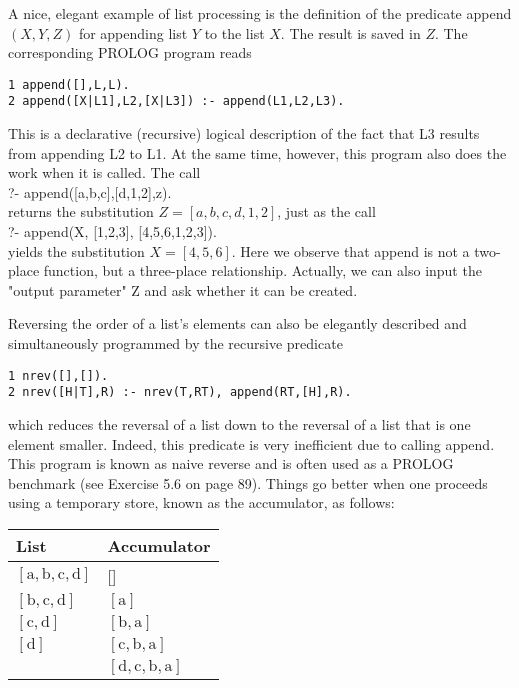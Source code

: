 \documentclass[10pt]{article}
\begin{document}
A nice, elegant example of list processing is the definition of the predicate append $(X, Y, Z)$ for appending list $Y$ to the list $X$. The result is saved in $Z$. The corresponding PROLOG program reads

\begin{verbatim}
1 append([],L,L).
2 append([X|L1],L2,[X|L3]) :- append(L1,L2,L3).
\end{verbatim}

This is a declarative (recursive) logical description of the fact that L3 results from appending L2 to L1. At the same time, however, this program also does the work when it is called. The call\\[0pt]
?- append([a,b,c],[d,1,2],z).\\
returns the substitution $Z=[a, b, c, d, 1,2]$, just as the call\\[0pt]
?- append(X, [1,2,3], [4,5,6,1,2,3]).\\
yields the substitution $X=[4,5,6]$. Here we observe that append is not a two-place function, but a three-place relationship. Actually, we can also input the "output parameter" Z and ask whether it can be created.

Reversing the order of a list's elements can also be elegantly described and simultaneously programmed by the recursive predicate

\begin{verbatim}
1 nrev([],[]).
2 nrev([H|T],R) :- nrev(T,RT), append(RT,[H],R).
\end{verbatim}

which reduces the reversal of a list down to the reversal of a list that is one element smaller. Indeed, this predicate is very inefficient due to calling append. This program is known as naive reverse and is often used as a PROLOG benchmark (see Exercise 5.6 on page 89). Things go better when one proceeds using a temporary store, known as the accumulator, as follows:

\begin{center}
\begin{tabular}{ll}
\hline
List & Accumulator \\
\hline
$[\mathrm{a}, \mathrm{b}, \mathrm{c}, \mathrm{d}]$ & [] \\
\hline
$[\mathrm{b}, \mathrm{c}, \mathrm{d}]$ & $[\mathrm{a}]$ \\
\hline
$[\mathrm{c}, \mathrm{d}]$ & $[\mathrm{b}, \mathrm{a}]$ \\
\hline
$[\mathrm{d}]$ & $[\mathrm{c}, \mathrm{b}, \mathrm{a}]$ \\
\hline
[] & $[\mathrm{d}, \mathrm{c}, \mathrm{b}, \mathrm{a}]$ \\
\hline
\end{tabular}
\end{center}
\end{document}
